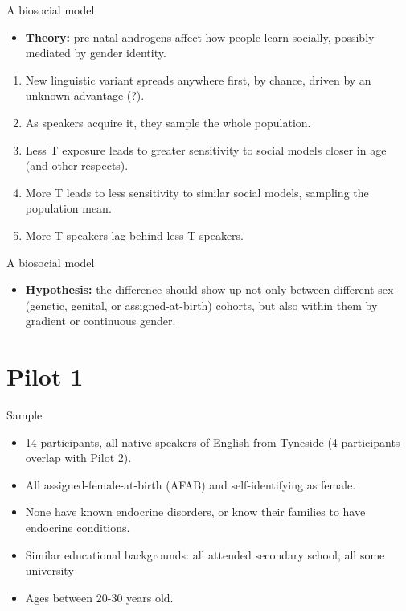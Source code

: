 \documentclass[hyperref={pdfpagelabels=false}]{beamer}
\begin{document}
\begin{frame}{A biosocial model}
	\begin{itemize}
	\item[ ] \textbf{Theory:} pre-natal androgens affect how people learn socially, possibly mediated by gender identity.
	\end{itemize}
	\begin{enumerate}
	\item New linguistic variant spreads anywhere first, by chance, driven by an unknown advantage (?).
	\item As speakers acquire it, they sample the whole population.
	\item Less T exposure leads to greater sensitivity to social models closer in age (and other respects).
	\item More T leads to less sensitivity to similar social models, sampling the population mean.
	\item More T speakers lag behind less T speakers.
	\end{enumerate}

\end{frame}

\begin{frame}{A biosocial model}
	\begin{itemize}
	\item \textbf{Hypothesis:} the difference should show up not only between different sex (genetic, genital, or assigned-at-birth) cohorts, but also within them by gradient or continuous gender.
	\end{itemize}
\end{frame}


\section{Pilot 1}


\begin{frame}{Sample}
\begin{itemize}
	\item 14 participants, all native speakers of English from Tyneside (4 participants overlap with Pilot 2).
	\item All assigned-female-at-birth (AFAB) and self-identifying as female.
	\item None have known endocrine disorders, or know their families to have endocrine conditions.
	\item Similar educational backgrounds: all attended secondary school, all some university
	\item Ages between 20-30 years old.
\end{itemize}
\end{frame}
\end{document}

